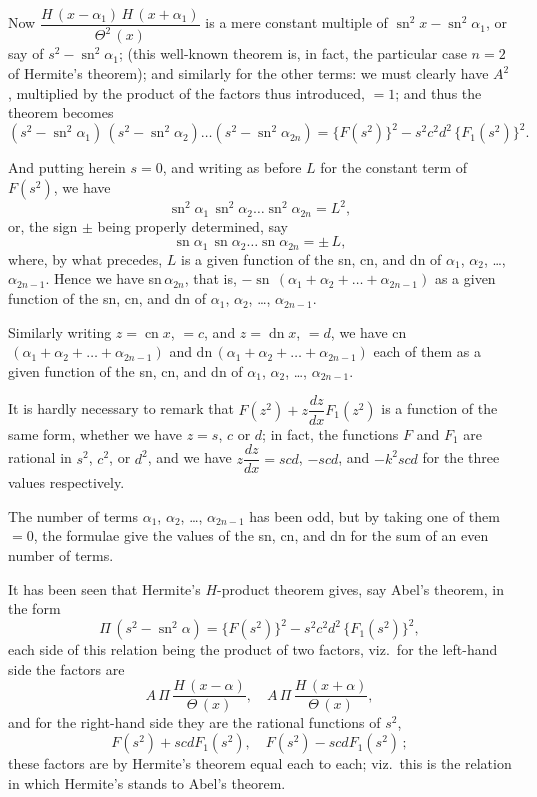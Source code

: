 \documentclass[11pt,a4paper]{book}
\begin{document}
Now $\dfrac{H\,(x-\alpha_1)\, H\,(x+\alpha_1)}{\Theta^2\,(x)}$ is a mere constant multiple of $\operatorname{sn}^2 x - \operatorname{sn}^2 \alpha_1$, or say of $s^2 - \operatorname{sn}^2 \alpha_1$; (this well-known theorem is, in fact, the particular case $n=2$ of Hermite's theorem); and similarly for the other terms: we must clearly have $A^2$, multiplied by the product of the factors thus introduced, $=1$; and thus the theorem becomes
\[ (s^2 - \operatorname{sn}^2 \alpha_1)\, (s^2 - \operatorname{sn}^2 \alpha_2) \ldots (s^2 - \operatorname{sn}^2 \alpha_{2n}) = \{F(s^2)\}^2 - s^2 c^2 d^2\, \{F_1(s^2)\}^2. \]

And putting herein $s=0$, and writing as before $L$ for the constant term of $F(s^2)$, we have
\[ \operatorname{sn}^2 \alpha_1 \, \operatorname{sn}^2 \alpha_2 \ldots \operatorname{sn}^2 \alpha_{2n} = L^2, \]
or, the sign $\pm$ being properly determined, say
\[ \operatorname{sn} \alpha_1 \, \operatorname{sn} \alpha_2 \ldots \operatorname{sn} \alpha_{2n} = \pm\, L, \]
where, by what precedes, $L$ is a given function of the sn, cn, and dn of $\alpha_1$, $\alpha_2$, \ldots, $\alpha_{2n-1}$. Hence we have sn$\,\alpha_{2n}$, that is, $-\operatorname{sn}\,(\alpha_1 + \alpha_2 + \ldots + \alpha_{2n-1})$ as a given function of the sn, cn, and dn of $\alpha_1$, $\alpha_2$, \ldots, $\alpha_{2n-1}$.

Similarly writing $z = \operatorname{cn} x$, $=c$, and $z = \operatorname{dn} x$, $=d$, we have cn$\,(\alpha_1 + \alpha_2 + \ldots + \alpha_{2n-1})$ and dn$\,(\alpha_1 + \alpha_2 + \ldots + \alpha_{2n-1})$ each of them as a given function of the sn, cn, and dn of $\alpha_1$, $\alpha_2$, \ldots, $\alpha_{2n-1}$.

It is hardly necessary to remark that $F(z^2) + z\dfrac{dz}{dx}F_1(z^2)$ is a function of the same form, whether we have $z=s$, $c$ or $d$; in fact, the functions $F$ and $F_1$ are rational in $s^2$, $c^2$, or $d^2$, and we have $z\dfrac{dz}{dx} = scd$, $-scd$, and $-k^2 scd$ for the three values respectively.

The number of terms $\alpha_1$, $\alpha_2$, \ldots, $\alpha_{2n-1}$ has been odd, but by taking one of them $=0$, the formulae give the values of the sn, cn, and dn for the sum of an even number of terms.

It has been seen that Hermite's $H$-product theorem gives, say Abel's theorem, in the form
\[ \Pi\, (s^2 - \operatorname{sn}^2 \alpha) = \{F(s^2)\}^2 - s^2 c^2 d^2\, \{F_1(s^2)\}^2, \]
each side of this relation being the product of two factors, viz.\ for the left-hand side the factors are
\[ A\,\Pi\, \frac{H\,(x-\alpha)}{\Theta\,(x)},\quad A\,\Pi\, \frac{H\,(x+\alpha)}{\Theta\,(x)}, \]
and for the right-hand side they are the rational functions of $s^2$,
\[ F(s^2) + scdF_1(s^2),\quad F(s^2) - scdF_1(s^2)\,; \]
these factors are by Hermite's theorem equal each to each; viz.\ this is the relation in which Hermite's stands to Abel's theorem.
\end{document}
